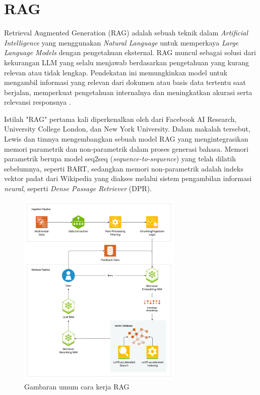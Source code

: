 \section{RAG}
\label{sec:rag}

Retrieval Augmented Generation (RAG) adalah sebuah teknik dalam \textit{Artificial Intelligence} yang menggunakan \textit{Natural Language} untuk memperkaya \textit{Large Language Models} dengan pengetahuan eksternal. RAG muncul sebagai solusi dari kekurangan LLM yang selalu menjawab berdasarkan pengetahuan yang kurang relevan atau tidak lengkap. Pendekatan ini memungkinkan model untuk mengambil informasi yang relevan dari dokumen atau basis data tertentu saat berjalan, memperkuat pengetahuan internalnya dan meningkatkan akurasi serta relevansi responsnya \parencite{merritt2025rag}.

Istilah "RAG" pertama kali diperkenalkan oleh \cite{lewis2020retrieval} dari Facebook AI Research, University College London, dan New York University. Dalam makalah tersebut, Lewis dan timnya mengembangkan sebuah model RAG yang mengintegrasikan memori parametrik dan non-parametrik dalam proses generasi bahasa. Memori parametrik berupa model seq2seq (\textit{sequence-to-sequence}) yang telah dilatih sebelumnya, seperti BART, sedangkan memori non-parametrik adalah indeks vektor padat dari Wikipedia yang diakses melalui sistem pengambilan informasi \textit{neural}, seperti \textit{Dense Passage Retriever} (DPR).

\begin{figure}[ht]
  \centering
  \includegraphics[width=0.7\textwidth]{resources/chapter-2/rag-overview.png}
  \caption{Gambaran umum cara kerja RAG \parencite{merritt2025rag}}
  \label{image:rag-overview}
\end{figure}

